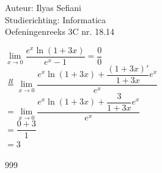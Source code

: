 \documentclass[a4paper]{article}
\newcommand{\llim}{\lim\limits}
\begin{document}
\noindent \large Auteur: Ilyas Sefiani \\
\noindent \large Studierichting: Informatica\\
\noindent \large Oefeningenreeks 3C nr. 18.14\\

\medskip

\normalsize

$\llim_{x \rightarrow 0} \dfrac{e^x\ln(1+3x)}{e^x-1} = \dfrac{0}{0}$\\

$\overset{H}{=}\llim_{x \rightarrow 0} \dfrac{e^x\ln(1+3x) + \dfrac{(1+3x)'}{1+3x}e^x}{e^x}$\\

$= \llim_{x \rightarrow 0} \dfrac{e^x\ln(1+3x) + \dfrac{3}{1+3x}e^x}{e^x}$\\  

$= \dfrac{0 + 3}{1}$\\

$= 3$\\

\begin{thebibliography}{999}
\end{thebibliography}
\end{document}
